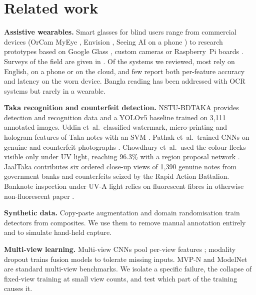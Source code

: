 \documentclass[preprint,12pt]{elsarticle}
\begin{document}
\section{Related work}
\label{sec:related}

\textbf{Assistive wearables.} Smart glasses for blind users range from commercial devices (OrCam MyEye \cite{orcam}, Envision \cite{envision}, Seeing AI on a phone \cite{seeingai}) to research prototypes based on Google Glass \cite{googleglass2021}, custom cameras \cite{airis2024,smartglass_mdpi2021} or Raspberry~Pi boards \cite{readingaid_rpi2023,thirdeye2019}. Surveys of the field are given in \cite{wearable_review2024,at_review2025}. Of the systems we reviewed, most rely on English, on a phone or on the cloud, and few report both per-feature accuracy and latency on the worn device. Bangla reading has been addressed with OCR systems \cite{banglaocr2021} but rarely in a wearable.

\textbf{Taka recognition and counterfeit detection.} NSTU-BDTAKA \cite{nstubdtaka2024} provides detection and recognition data and a YOLOv5 baseline trained on 3,111 annotated images. Uddin et~al.\ classified watermark, micro-printing and hologram features of Taka notes with an SVM \cite{uddin2016counterfeit}. Pathak et~al.\ trained CNNs on genuine and counterfeit photographs \cite{pathak2024counterfeit}. Chowdhury et~al.\ used the colour flecks visible only under UV light, reaching 96.3\% with a region proposal network \cite{chowdhury2022uvink}. JaalTaka \cite{jaaltaka,piyas2026jaaltaka} contributes six ordered close-up views of 1,390 genuine notes from government banks and counterfeits seized by the Rapid Action Battalion. Banknote inspection under UV-A light relies on fluorescent fibres in otherwise non-fluorescent paper \cite{mutanen2003luminescent,ecb2010quickguide}.

\textbf{Synthetic data.} Copy-paste augmentation \cite{copypaste2021,cutpaste2017} and domain randomisation \cite{tobin2017domain} train detectors from composites. We use them to remove manual annotation entirely and to simulate hand-held capture.

\textbf{Multi-view learning.} Multi-view CNNs pool per-view features \cite{mvcnn}; modality dropout \cite{moddrop} trains fusion models to tolerate missing inputs. MVP-N \cite{mvpn} and ModelNet \cite{modelnet} are standard multi-view benchmarks. We isolate a specific failure, the collapse of fixed-view training at small view counts, and test which part of the training causes it.
\end{document}

